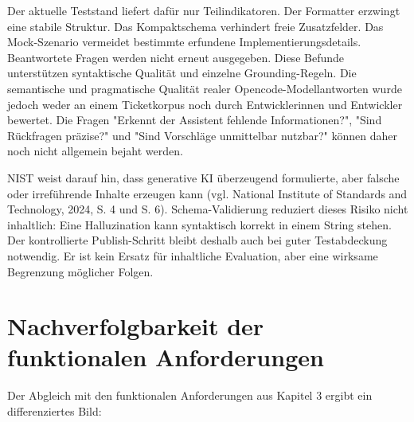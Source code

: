 Der aktuelle Teststand liefert dafür nur Teilindikatoren. Der Formatter erzwingt eine stabile Struktur. Das Kompaktschema verhindert freie Zusatzfelder. Das Mock-Szenario vermeidet bestimmte erfundene Implementierungsdetails. Beantwortete Fragen werden nicht erneut ausgegeben. Diese Befunde unterstützen syntaktische Qualität und einzelne Grounding-Regeln. Die semantische und pragmatische Qualität realer Opencode-Modellantworten wurde jedoch weder an einem Ticketkorpus noch durch Entwicklerinnen und Entwickler bewertet. Die Fragen "Erkennt der Assistent fehlende Informationen?", "Sind Rückfragen präzise?" und "Sind Vorschläge unmittelbar nutzbar?" können daher noch nicht allgemein bejaht werden.

NIST weist darauf hin, dass generative KI überzeugend formulierte, aber falsche oder irreführende Inhalte erzeugen kann (vgl. National Institute of Standards and Technology, 2024, S. 4 und S. 6). Schema-Validierung reduziert dieses Risiko nicht inhaltlich: Eine Halluzination kann syntaktisch korrekt in einem String stehen. Der kontrollierte Publish-Schritt bleibt deshalb auch bei guter Testabdeckung notwendig. Er ist kein Ersatz für inhaltliche Evaluation, aber eine wirksame Begrenzung möglicher Folgen.

\section{Nachverfolgbarkeit der funktionalen Anforderungen}

Der Abgleich mit den funktionalen Anforderungen aus Kapitel 3 ergibt ein differenziertes Bild:

